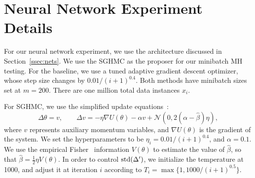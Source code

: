 \documentclass{article}
\begin{document}
\section{Neural Network Experiment Details}\label{app:nnet}

For our neural network experiment, we use the architecture discussed in Section~\ref{ssec:nets}. We
use the SGHMC as the proposer for our minibatch MH testing. For the baseline, we use a tuned
adaptive gradient descent optimizer, whose step size changes by $0.01 /(i+1)^{0.4}$. Both methods
have minibatch sizes set at $m=200$. There are one million total data instances $x_i$.

For SGHMC, we use the simplified update equations~\cite{sghmc_2014}:
\begin{equation}
\Delta \theta = v, \quad \quad\Delta v = -\eta \nabla U(\theta) - \alpha v + \mathcal{N}(0, 2(\alpha
-\hat{\beta}) \eta),
\end{equation}
where $v$ represents auxiliary momentum variables, and $\nabla U(\theta)$ is the gradient of the
system. We set the hyperparameters to be $\eta_i = 0.01 /(i+1)^{0.4}$, and $\alpha=0.1$. We use the
empirical Fisher~\cite{conf/icml/AhnBW12} information $V(\theta)$ to estimate the value of
$\hat{\beta}$, so that $\hat{\beta}=\frac{1}{2}\eta V(\theta)$. In order to control ${\rm
std}(\Delta')$, we initialize the temperature at 1000, and adjust it at iteration $i$ according to
$T_i = \max\{1, 1000/(i+1)^{0.5}\}$.

\end{document}
